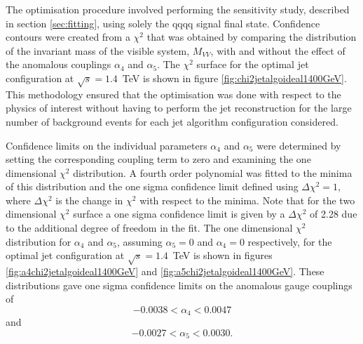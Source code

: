 The optimisation procedure involved performing the sensitivity study, described in section \ref{sec:fitting}, using solely the {\nu}{\nu}qqqq signal final state.  Confidence contours were created from a $\chi^{2}$ that was obtained by comparing the distribution of the invariant mass of the visible system, $M_{VV}$, with and without the effect of the anomalous couplings $\alpha_{4}$ and $\alpha_{5}$.  The $\chi^{2}$ surface for the optimal jet configuration at $\sqrt{s}=1.4$~TeV is shown in figure \ref{fig:chi2jetalgoideal1400GeV}.  This methodology ensured that the optimisation was done with respect to the physics of interest without having to perform the jet reconstruction for the large number of background events for each jet algorithm configuration considered.  

Confidence limits on the individual parameters $\alpha_{4}$ and $\alpha_{5}$ were determined by setting the corresponding coupling term to zero and examining the one dimensional $\chi^{2}$ distribution.  A fourth order polynomial was fitted to the minima of this distribution and the one sigma confidence limit defined using $\Delta\chi^{2} = 1$, where $\Delta\chi^{2}$ is the change in $\chi^{2}$ with respect to the minima.  Note that for the two dimensional $\chi^{2}$ surface a one sigma confidence limit is given by a $\Delta\chi^{2}$ of 2.28 due to the additional degree of freedom in the fit.  The one dimensional $\chi^{2}$ distribution for $\alpha_{4}$ and $\alpha_{5}$, assuming $\alpha_{5} = 0$ and $\alpha_{4} = 0$ respectively, for the optimal jet configuration at $\sqrt{s}=1.4$~TeV is shown in figures \ref{fig:a4chi2jetalgoideal1400GeV} and \ref{fig:a5chi2jetalgoideal1400GeV}.  These distributions gave one sigma confidence limits on the anomalous gauge couplings of
%
\begin{equation}
-0.0038 < \alpha_{4} < 0.0047 
\end{equation}
\noindent and 
\begin{equation}
-0.0027 < \alpha_{5} < 0.0030 \text{.}
\end{equation}
%
